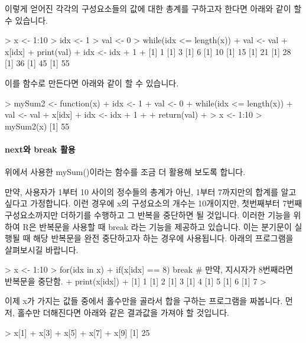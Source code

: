 이렇게 얻어진 각각의 구성요소들의 값에 대한 총계를 구하고자 한다면 아래와 같이 할 수 있습니다.

\begin{Schunk}
\begin{Soutput}
> x <- 1:10
> idx <- 1
> val <- 0
> while(idx <= length(x)){
+ val <- val + x[idx]
+ print(val)
+ idx <- idx + 1
+ }
[1] 1
[1] 3
[1] 6
[1] 10
[1] 15
[1] 21
[1] 28
[1] 36
[1] 45
[1] 55

\end{Soutput}
\end{Schunk}

이를 함수로 만든다면 아래와 같이 할 수 있습니다. 

\begin{Schunk}
\begin{Soutput}
> mySum2 <- function(x){
+ idx <- 1
+ val <- 0
+ while(idx <= length(x)){
+ val <- val + x[idx]
+ idx <- idx + 1
+ }
+ return(val)
+ }
> x <- 1:10
> mySum2(x)
[1] 55
\end{Soutput}
\end{Schunk}

\paragraph{next와 break 활용}

위에서 사용한 mySum()이라는 함수를 조금 더 활용해 보도록 합니다.

만약, 사용자가 1부터 10 사이의 정수들의 총계가 아닌, 1부터 7까지만의 합계를 알고 싶다고 가정합니다. 
이런 경우에 x의 구성요소의 개수는 10개이지만, 첫번째부터 7번째 구성요소까지만 더하기를 수행하고 그 반복을 중단하면 될 것입니다.
이러한 기능을 위하여 R은 반복문을 사용할 때 break 라는 기능을 제공하고 있습니다.
이는 분기문이 실행될 때 해당 반복문을 완전 중단하고자 하는 경우에 사용됩니다. 
아래의 프로그램을 살펴보시길 바랍니다. 

\begin{Schunk}
\begin{Soutput}
> x <- 1:10
> for(idx in x){
+ if(x[idx] == 8) break  # 만약, 지시자가 8번째라면 반복문을 중단함. 
+ print(x[idx])
+ }
[1] 1
[1] 2
[1] 3
[1] 4
[1] 5
[1] 6
[1] 7
> 
\end{Soutput}
\end{Schunk}

이제 x가 가지는 값들 중에서 홀수만을 골라서 합을 구하는 프로그램을 짜봅니다. 
먼저, 홀수만 더해진다면 아래와 같은 결과값을 가져야 할 것입니다. 

\begin{Schunk}
\begin{Soutput}
> x[1] + x[3] + x[5] + x[7] + x[9]
[1] 25
\end{Soutput}
\end{Schunk}

